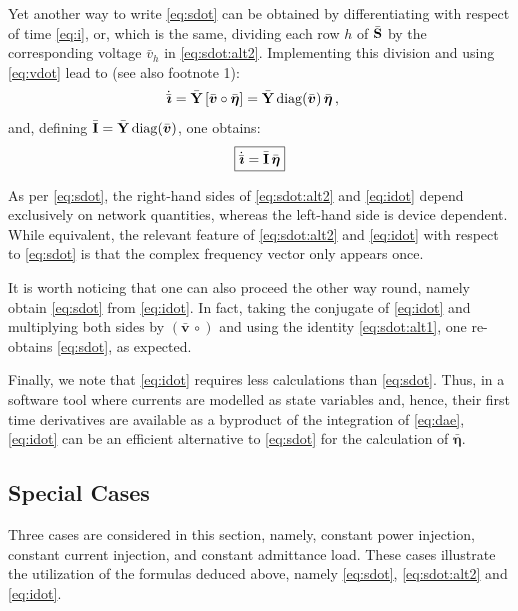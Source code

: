 \documentclass[journal, twocolumn, letter]{IEEEtran}
\newcommand{\bfg}[1]{\boldsymbol{#1}}
\newcommand{\bfp}[1]{\bar{\boldsymbol{#1}}}
\newcommand{\bfb}[1]{\boldsymbol{\rm #1}}
\newcommand{\vhbar}{\bar{v}_h}
\newcommand{\ii}{\imath}
\newcommand{\idot}{\dot{\bar{\bfg \ii}}}
\newcommand{\vvec}{\bfp v}
\newcommand{\evec}{\bar{\bfg \eta}}
\newcommand{\Sbus}{\bar{\bfb S}}
\newcommand{\Ibus}{\bar{\bfb I}}
\newcommand{\Ybus}{\bar{\bfb Y}}
\begin{document}
Yet another way to write \eqref{eq:sdot} can be obtained by
 differentiating  with respect of time
\eqref{eq:i}, or, which is the same, dividing each row $h$ of $\Sbus$
by the corresponding voltage $\vhbar$ in \eqref{eq:sdot:alt2}.
 Implementing this division and using \eqref{eq:vdot}
 lead to (see also footnote 1):
\begin{equation}
  \label{eq:sdot:alt3}
  \begin{aligned}
    \idot &= \Ybus \, [\vvec \circ \evec]
    = \Ybus \, {\rm diag}(\vvec) \, \evec \, ,
  \end{aligned}
\end{equation}
and, defining $\Ibus = \Ybus \, {\rm diag}(\vvec)$, one obtains:
\begin{equation}
  \label{eq:idot}
  \boxed{\idot = \Ibus \, \evec}
\end{equation}


As per \eqref{eq:sdot}, the right-hand sides of \eqref{eq:sdot:alt2}
and \eqref{eq:idot} depend exclusively on network quantities, whereas
the left-hand side is device dependent.  While equivalent, the
relevant feature of \eqref{eq:sdot:alt2} and \eqref{eq:idot} with
respect to \eqref{eq:sdot} is that the complex frequency vector only
appears once.



It is worth noticing that one can also proceed the other way round,
namely obtain \eqref{eq:sdot} from \eqref{eq:idot}.  In fact, taking
the conjugate of \eqref{eq:idot} and multiplying both sides by
$(\vvec \, \circ)$ and using the identity \eqref{eq:sdot:alt1}, one
re-obtains \eqref{eq:sdot}, as expected.

Finally, we note that \eqref{eq:idot} requires less calculations than
\eqref{eq:sdot}.  Thus, in a software tool where currents are modelled
as state variables and, hence, their first time derivatives are
available as a byproduct of the integration of \eqref{eq:dae},
\eqref{eq:idot} can be an efficient alternative to \eqref{eq:sdot} for
the calculation of $\evec$.









\subsection{Special Cases}
\label{sub:special}

Three cases are considered in this section, namely, constant power
injection, constant current injection, and constant admittance load.
These cases illustrate the utilization of the formulas deduced above,
namely \eqref{eq:sdot}, \eqref{eq:sdot:alt2} and \eqref{eq:idot}.
\end{document}
